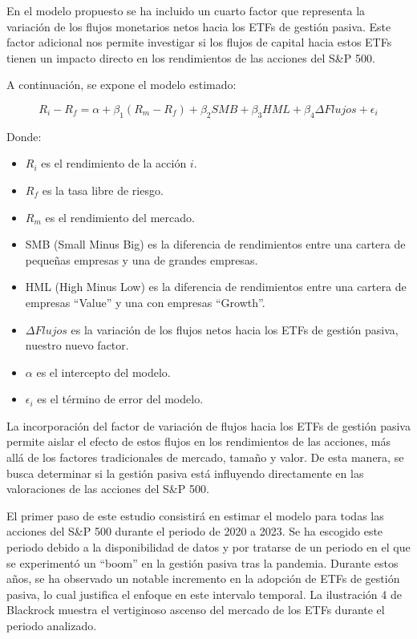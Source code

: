 \documentclass[12pt,a4paper]{article}
\begin{document}
En el modelo propuesto se ha incluido un cuarto factor que representa la variación de los flujos monetarios netos hacia los ETFs de gestión pasiva. Este factor adicional nos permite investigar si los flujos de capital hacia estos ETFs tienen un impacto directo en los rendimientos de las acciones del S\&P 500.

A continuación, se expone el modelo estimado:

\begin{equation}
R_i - R_f = \alpha + \beta_1(R_m - R_f) + \beta_2 SMB + \beta_3 HML + \beta_4 \Delta Flujos + \epsilon_i
\end{equation}

Donde:
\begin{itemize}
\item $R_i$ es el rendimiento de la acción $i$.
\item $R_f$ es la tasa libre de riesgo.
\item $R_m$ es el rendimiento del mercado.
\item SMB (Small Minus Big) es la diferencia de rendimientos entre una cartera de pequeñas empresas y una de grandes empresas.
\item HML (High Minus Low) es la diferencia de rendimientos entre una cartera de empresas ``Value'' y una con empresas ``Growth''.
\item $\Delta Flujos$ es la variación de los flujos netos hacia los ETFs de gestión pasiva, nuestro nuevo factor.
\item $\alpha$ es el intercepto del modelo.
\item $\epsilon_i$ es el término de error del modelo.
\end{itemize}

La incorporación del factor de variación de flujos hacia los ETFs de gestión pasiva permite aislar el efecto de estos flujos en los rendimientos de las acciones, más allá de los factores tradicionales de mercado, tamaño y valor. De esta manera, se busca determinar si la gestión pasiva está influyendo directamente en las valoraciones de las acciones del S\&P 500.

El primer paso de este estudio consistirá en estimar el modelo para todas las acciones del S\&P 500 durante el periodo de 2020 a 2023. Se ha escogido este periodo debido a la disponibilidad de datos y por tratarse de un periodo en el que se experimentó un ``boom'' en la gestión pasiva tras la pandemia. Durante estos años, se ha observado un notable incremento en la adopción de ETFs de gestión pasiva, lo cual justifica el enfoque en este intervalo temporal. La ilustración 4 de Blackrock muestra el vertiginoso ascenso del mercado de los ETFs durante el periodo analizado.
\end{document}
